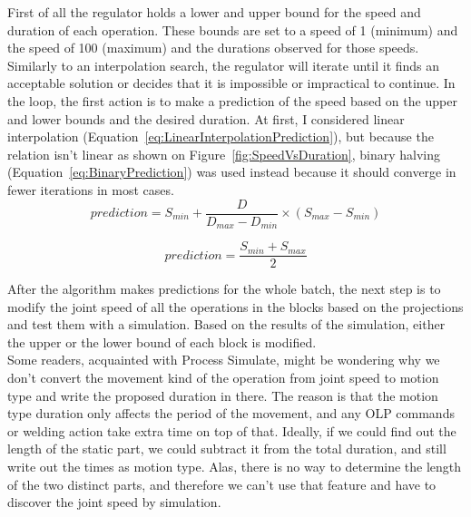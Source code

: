 
First of all the regulator holds a lower and upper bound for the speed and duration of each operation. These bounds are set to a speed of 1 (minimum) and the speed of 100 (maximum) and the durations observed for those speeds. Similarly to an interpolation search, the regulator will iterate until it finds an acceptable solution or decides that it is impossible or impractical to continue. In the loop, the first action is to make a prediction of the speed based on the upper and lower bounds and the desired duration. At first, I considered linear interpolation (Equation~\ref{eq:LinearInterpolationPrediction}), but because the relation isn't linear as shown on Figure~\ref{fig:SpeedVsDuration}, binary halving (Equation~\ref{eq:BinaryPrediction}) was used instead because it should converge in fewer iterations in most cases. \\

\begin{equation} \label{eq:LinearInterpolationPrediction}
    prediction = S_{min} + \frac{D}{D_{max}-D_{min}} \times (S_{max}-S_{min})
\end{equation}

\begin{equation} \label{eq:BinaryPrediction}
    prediction = \frac{S_{min} + S_{max}}{2}
\end{equation}

After the algorithm makes predictions for the whole batch, the next step is to modify the joint speed of all the operations in the blocks based on the projections and test them with a simulation. Based on the results of the simulation, either the upper or the lower bound of each block is modified. \\

Some readers, acquainted with Process Simulate, might be wondering why we don't convert the movement kind of the operation from joint speed to motion type and write the proposed duration in there. The reason is that the motion type duration only affects the period of the movement, and any OLP commands or welding action take extra time on top of that. Ideally, if we could find out the length of the static part, we could subtract it from the total duration, and still write out the times as motion type. Alas, there is no way to determine the length of the two distinct parts, and therefore we can't use that feature and have to discover the joint speed by simulation. \\

